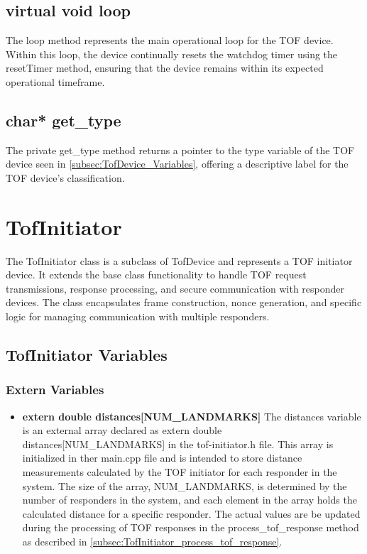 \subsection{virtual void loop}
\label{subsec:TofDevice_loop}
The loop method represents the main operational loop for the TOF device. 
Within this loop, the device continually resets the watchdog timer using the resetTimer method, ensuring that the device remains within its expected operational timeframe. 

\subsection{char* get\_type}
\label{subsec:TofDevice_get_type}
The private get\_type method returns a pointer to the type variable of the TOF device seen in \ref{subsec:TofDevice_Variables}, offering a descriptive label for the TOF device's classification.

\section{TofInitiator}
\label{sec:TofInitiator}
The TofInitiator class is a subclass of TofDevice and represents a TOF initiator device. 
It extends the base class functionality to handle TOF request transmissions, response processing, and secure communication with responder devices. 
The class encapsulates frame construction, nonce generation, and specific logic for managing communication with multiple responders.

\subsection{TofInitiator Variables}
\label{subsec:TofInitiator_Variables}

\subsubsection{Extern Variables}
\begin{itemize}
	\item \textbf{extern double distances[NUM\_LANDMARKS]}
	\newline
	The distances variable is an external array declared as extern double 
	\newline
	distances[NUM\_LANDMARKS] in the tof-initiator.h file. 
	This array is initialized in ther main.cpp file and is intended to store distance measurements calculated by the TOF initiator for each responder in the system. 
	The size of the array, NUM\_LANDMARKS, is determined by the number of responders in the system, and each element in the array holds the calculated distance for a specific responder. 
	The actual values are be updated during the processing of TOF responses in the process\_tof\_response method as described in \ref{subsec:TofInitiator_process_tof_response}.
\end{itemize}

